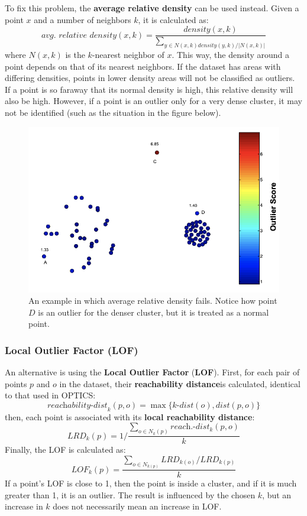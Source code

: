 To fix this problem, the \textbf{average relative density} can be used instead. Given a point $x$ and a number of neighbors $k$, it is calculated as:
\begin{equation*}
    \textit{avg. relative density}(x,k) = \dfrac{\textit{density}(x,k)}{\sum_{y \in N(x,k) \textit{density}(y,k)/|N(x,k)|}}
\end{equation*}
where $N(x,k)$ is the $k$-nearest neighbor of $x$. This way, the density around a point depends on that of its nearest neighbors. If the dataset has areas with differing densities, points in lower density areas will not be classified as outliers. If a point is so faraway that its normal density is high, this relative density will also be high. However, if a point is an outlier only for a very dense cluster, it may not be identified (such as the situation in the figure below).
\begin{figure}[ht]
    \centering
    \includegraphics[width=0.5\linewidth]{img/relative_density.png}
    \caption{An example in which average relative density fails. Notice how point $D$ is an outlier for the denser cluster, but it is treated as a normal point.}
    \label{fig:relative-dist}
\end{figure}

\subsubsection{Local Outlier Factor (LOF)}

An alternative is using the \textbf{Local Outlier Factor} (\textbf{LOF}). First, for each pair of points $p$ and $o$ in the dataset, their \textbf{reachability distance}is calculated, identical to that used in OPTICS:
\begin{equation*}
    \textit{reachability-dist}_k(p,o) = \max \{\textit{k-dist}(o), \textit{dist}(p,o)\}
\end{equation*}
then, each point is associated with its \textbf{local reachability distance}:
\begin{equation*}
    \textit{LRD}_k(p) = 1 / \dfrac{\sum_{o \in \textit{N}_k(p)} \textit{reach.-dist}_k(p,o)}{k}
\end{equation*}
Finally, the LOF is calculated as:
\begin{equation*}
    \textit{LOF}_{\textit{k}}(p) = \dfrac{\sum_{o \in N_{k(p)}} \textit{LRD}_{k(o)} / \textit{LRD}_{k(p)} }{k}
\end{equation*}
If a point's LOF is close to 1, then the point is inside a cluster, and if it is much greater than 1, it is an outlier. The result is influenced by the chosen $k$, but an increase in $k$ does not necessarily mean an increase in LOF.

